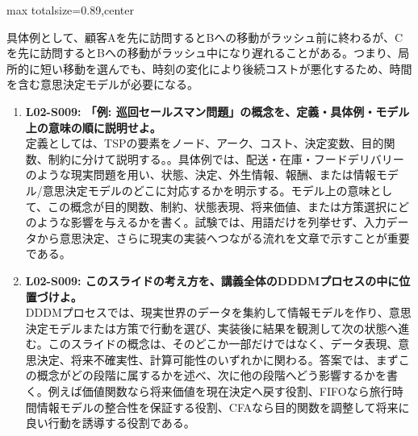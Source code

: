 \begin{minipage}[t]{0.58\textwidth}
\begin{adjustbox}{max totalsize={\textwidth}{0.89\textheight},center}
\begin{minipage}{\textwidth}
具体例として、顧客Aを先に訪問するとBへの移動がラッシュ前に終わるが、Cを先に訪問するとBへの移動がラッシュ中になり遅れることがある。つまり、局所的に短い移動を選んでも、時刻の変化により後続コストが悪化するため、時間を含む意思決定モデルが必要になる。\par{}\begin{enumerate}\item \textbf{L02-S009: 「例: 巡回セールスマン問題」の概念を、定義・具体例・モデル上の意味の順に説明せよ。}\\定義としては、TSPの要素をノード、アーク、コスト、決定変数、目的関数、制約に分けて説明する。。具体例では、配送・在庫・フードデリバリーのような現実問題を用い、状態、決定、外生情報、報酬、または情報モデル/意思決定モデルのどこに対応するかを明示する。モデル上の意味として、この概念が目的関数、制約、状態表現、将来価値、または方策選択にどのような影響を与えるかを書く。試験では、用語だけを列挙せず、入力データから意思決定、さらに現実の実装へつながる流れを文章で示すことが重要である。\item \textbf{L02-S009: このスライドの考え方を、講義全体のDDDMプロセスの中に位置づけよ。}\\DDDMプロセスでは、現実世界のデータを集約して情報モデルを作り、意思決定モデルまたは方策で行動を選び、実装後に結果を観測して次の状態へ進む。このスライドの概念は、そのどこか一部だけではなく、データ表現、意思決定、将来不確実性、計算可能性のいずれかに関わる。答案では、まずこの概念がどの段階に属するかを述べ、次に他の段階へどう影響するかを書く。例えば価値関数なら将来価値を現在決定へ戻す役割、FIFOなら旅行時間情報モデルの整合性を保証する役割、CFAなら目的関数を調整して将来に良い行動を誘導する役割である。\end{enumerate}
\end{minipage}
\end{adjustbox}
\end{minipage}


